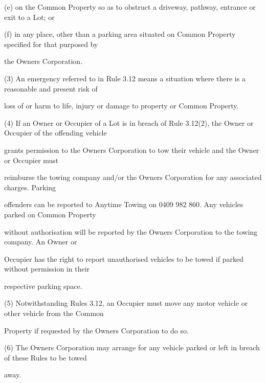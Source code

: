 \documentclass{article}
\begin{document}
{\fontsize{9.962}{1}(e) on the Common Property so as to obstruct a driveway, pathway, entrance or exit to a Lot; or }

{\fontsize{9.962}{1}(f) in any place, other than a parking area situated on Common Property specified for that purposed by }

{\fontsize{10.02}{1}the Owners Corporation. }

{\fontsize{9.962}{1}(3) An emergency referred to in Rule 3.12 means a situation where there is a reasonable and present risk of }

{\fontsize{10.02}{1}loss of or harm to life, injury or damage to property or Common Property. }

{\fontsize{9.962}{1}(4) If an Owner or Occupier of a Lot is in breach of Rule 3.12(2), the Owner or Occupier of the offending vehicle }

{\fontsize{10.02}{1}grants permission to the Owners Corporation to tow their vehicle and the Owner or Occupier must }

{\fontsize{10.02}{1}reimburse the towing company and/or the Owners Corporation for any associated charges. Parking }

{\fontsize{10.02}{1}offenders can be reported to Anytime Towing on 0409 982 860. Any vehicles parked on Common Property }

{\fontsize{10.02}{1}without authorisation will be reported by the Owners Corporation to the towing company. An Owner or }

{\fontsize{10.02}{1}Occupier has the right to report unauthorised vehicles to be towed if parked without permission in their }

{\fontsize{10.02}{1}respective parking space. }

{\fontsize{9.962}{1}(5) Notwithstanding Rules 3.12, an Occupier must move any motor vehicle or other vehicle from the Common }

{\fontsize{10.02}{1}Property if requested by the Owners Corporation to do so. }

{\fontsize{9.962}{1}(6) The Owners Corporation may arrange for any vehicle parked or left in breach of these Rules to be towed }

{\fontsize{10.02}{1}away. }

\newpage
\end{document}
